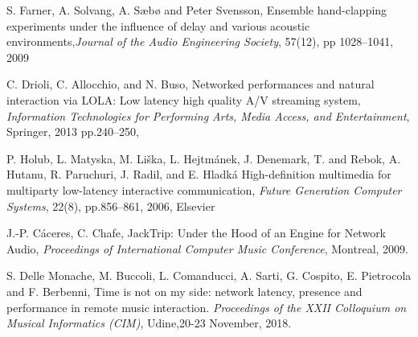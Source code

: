 S. Farner, A. Solvang, A. Sæbø and Peter Svensson, Ensemble hand-clapping experiments under
the influence of delay and various acoustic
environments,\emph{Journal of the Audio Engineering Society}, 57(12),
  pp 1028--1041, 2009


C. Drioli, C. Allocchio, and N. Buso,
  Networked performances and natural interaction via LOLA: Low latency high quality A/V streaming system,
  \emph{Information Technologies for Performing Arts, Media Access, and Entertainment}, Springer, 2013
  pp.240--250,

P. Holub, L. Matyska, M. Li{\v{s}}ka, L. Hejtm{\'a}nek, J. Denemark, T. and Rebok, A. Hutanu, R. Paruchuri, J. Radil, and E. Hladk{\'a}
  High-definition multimedia for multiparty low-latency interactive communication,
  \emph{Future Generation Computer Systems},
 22(8),
  pp.856--861,
 2006,
Elsevier

J.-P. C\'{a}ceres, C. Chafe, JackTrip: Under the Hood of an Engine for Network Audio, \emph{Proceedings of International Computer Music Conference}, Montreal, 2009. 

S. Delle Monache, M. Buccoli, L. Comanducci, A. Sarti, G. Cospito, E. Pietrocola and F. Berbenni, Time is not on my side: network latency, presence and performance in remote music interaction. \emph{Proceedings of the XXII Colloquium on Musical Informatics (CIM)}, Udine,20-23 November, 2018.



%	
%	
%	
%	
%	
%	
%	